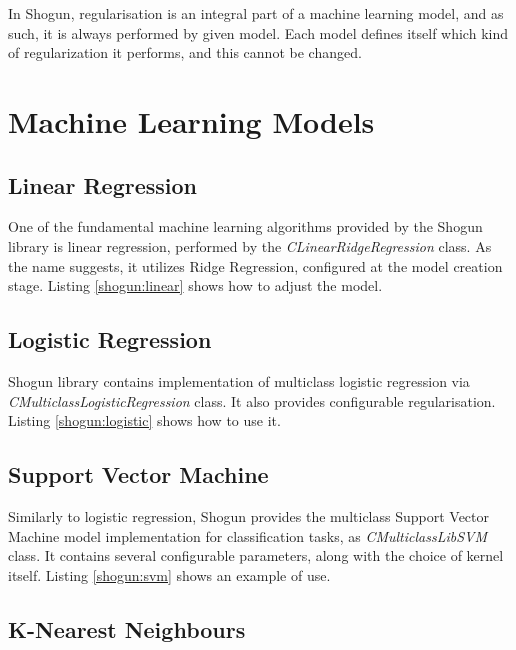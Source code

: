In Shogun, regularisation is an integral part of a machine learning model, and as such, it is always performed by given model. Each model defines itself which kind of regularization it performs, and this cannot be changed.

\section{Machine Learning Models}
\subsection{Linear Regression}
One of the fundamental machine learning algorithms provided by the Shogun library is linear regression, performed by the \textit{CLinearRidgeRegression} class. As the name suggests, it utilizes Ridge Regression, configured at the model creation stage. Listing \ref{shogun:linear} shows how to adjust the model.


\subsection{Logistic Regression}
Shogun library contains implementation of multiclass logistic regression via \textit{CMulticlassLogisticRegression} class. It also provides configurable regularisation. Listing \ref{shogun:logistic} shows how to use it.


\subsection{Support Vector Machine}
Similarly to logistic regression, Shogun provides the multiclass Support Vector Machine model implementation for classification tasks, as \textit{CMulticlassLibSVM} class. It contains several configurable parameters, along with the choice of kernel itself. Listing \ref{shogun:svm} shows an example of use.


\subsection{K-Nearest Neighbours}

